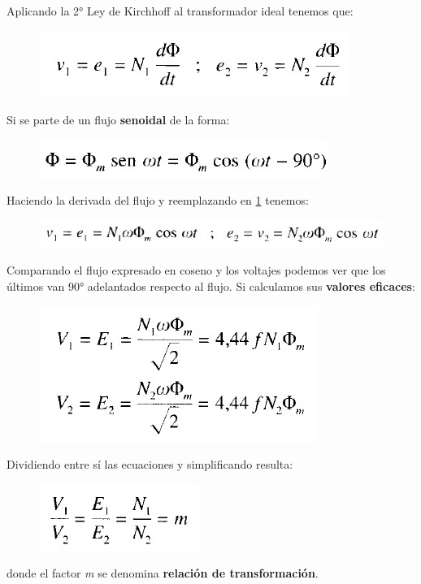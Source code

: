  Aplicando la 2° Ley de Kirchhoff al transformador ideal tenemos que:
 
 \begin{figure}[!htbp]
 	\centering
 	\includegraphics[width=0.40\linewidth]{"../Figuras/2"}
 	\label{fig:voltaje}
 \end{figure} 

Si se parte de un flujo \textbf{senoidal} de la forma:
 \begin{figure}[!htbp]
	\centering
	\includegraphics[width=0.40\linewidth]{"../Figuras/3"}
\end{figure} 

Haciendo la derivada del flujo y reemplazando en \ref{fig:voltaje} tenemos:
 \begin{figure}[!htbp]
	\centering
	\includegraphics[width=0.60\linewidth]{"../Figuras/4"}
\end{figure} 

Comparando el flujo expresado en coseno y los voltajes podemos ver que los últimos van 90° adelantados respecto al flujo. Si calculamos sus \textbf{valores eficaces}:

 \begin{figure}[!htbp]
	\centering
	\includegraphics[width=0.30\linewidth]{"../Figuras/5"}
\end{figure} 

Dividiendo entre sí las ecuaciones y simplificando resulta:

 \begin{figure}[H]
	\centering
	\includegraphics[width=0.20\linewidth]{"../Figuras/6"}
\end{figure} 

donde el factor \textit{m} se denomina \textbf{relación de transformación}.

